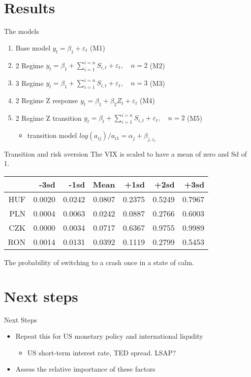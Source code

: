 \documentclass[14pt,xcolor=pdftex,dvipsnames,table, handout]{beamer}
\begin{document}
\section{Results}
\begin{frame}{The models}
\begin{enumerate}[<+-| alert@+>]
\item Base model $y_t = \beta_1 + \varepsilon_t$ (M1)
\item 2 Regime $y_t = \beta_1 + \sum_{i=1}^{i=n}S_{i,t} + \varepsilon_t, \quad n = 2$ (M2) 
\item 3 Regime $y_t = \beta_1 + \sum_{i=1}^{i=n}S_{i,t} + \varepsilon_t, \quad n = 3$ (M3)
\item 2 Regime Z response $y_t = \beta_1 + \beta_2 Z_t + \varepsilon_t$ (M4)
\item 2 Regime Z transition $y_t = \beta_t + \sum_{i=1}^{i=n}S_{i,t} + \varepsilon_t, \quad n = 2$ (M5) 
\begin{itemize}
\item transition model $log(a_{ij})/ a_{i1} = \alpha_j +\beta_{j,z_t}$
\end{itemize}
\end{enumerate}
\end{frame}

\begin{frame}{Transition and risk aversion}
The VIX is scaled to have a mean of zero and Sd of 1.  
\begin{center}
\begin{tabular}{rrrrrrr}
  \hline
 & -3sd & -1sd & Mean & +1sd & +2sd & +3sd \\ 
  \hline
  HUF & 0.0020 &  0.0242 & 0.0807 & 0.2375 & 0.5249 & 0.7967 \\ 
  PLN & 0.0004 &  0.0063 & 0.0242 & 0.0887 & 0.2766 & 0.6003 \\ 
  CZK & 0.0000 &  0.0034 & 0.0717 & 0.6367 & 0.9755 & 0.9989 \\ 
  RON & 0.0014 &  0.0131 & 0.0392 & 0.1119 & 0.2799 & 0.5453  
\end{tabular}
\end{center}
The probability of switching to a crash once in a state of calm.
\end{frame}


\section{Next steps}
\begin{frame}{Next Steps}
\begin{itemize}[<+-| alert@+>]
\item Repeat this for US monetary policy and international liqudity
\begin{itemize}
\item US short-term interest rate, TED spread.  LSAP?
\end{itemize}
\item Assess the relative importance of these factors
\end{itemize}
\end{frame}
\end{document}
